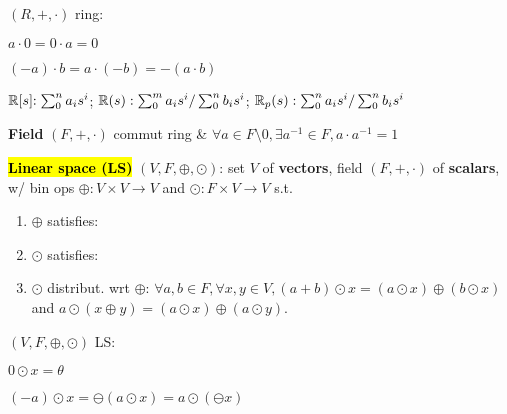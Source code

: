 \begin{Fact}
$(R,+,\cdot)$ ring:
\begin{enumerate*}
  \item $a\cdot 0=0\cdot a=0$
  \item $(-a)\cdot b=a\cdot(-b)=-(a\cdot b)$
\end{enumerate*}
\end{Fact}
\begin{Definition}
$\mathbb R[s]\hspace{-1mm}:\sum_{0}^n a_i s^i$;
$\mathbb R(s):\sum_{0}^m a_i s^i/\sum_{0}^n b_i s^i$;
$\mathbb R_p(s):\sum_{0}^n a_i s^i/\sum_{0}^n b_i s^i$
\end{Definition}
\begin{Definition}
\textbf{Field} $(F,+,\cdot)$ commut ring \& $\forall a\in F\setminus0, \exists a^{-1}\in F,a\cdot a^{-1}=1$
\end{Definition}
\begin{Definition}
\textbf{\hl{Linear space (LS)}} $(V,F,\oplus,\odot)$: set $V$ of \textbf{vectors}, field $(F,+,\cdot)$ of \textbf{scalars}, w/ bin ops $\oplus:V\times V\to V$ and $\odot:F\times V\to V$ s.t.
\begin{enumerate}[leftmargin=4mm]
  \item $\oplus$ satisfies:
  \item $\odot$ satisfies:
  \item $\odot$ distribut. wrt $\oplus$: $\forall a,b\in F,\forall x,y\in V,(a+b)\odot x=(a\odot x)\oplus(b\odot x)$ and $a\odot(x\oplus y)=(a\odot x)\oplus(a\odot y)$.
\end{enumerate}
\end{Definition}
\begin{Fact}
$(V,F,\oplus,\odot)$ LS:
\begin{enumerate*}
  \item $0\odot x=\theta$
  \item $(-a)\odot x=\ominus(a\odot x)=a\odot(\ominus x)$
\end{enumerate*}
\end{Fact}
